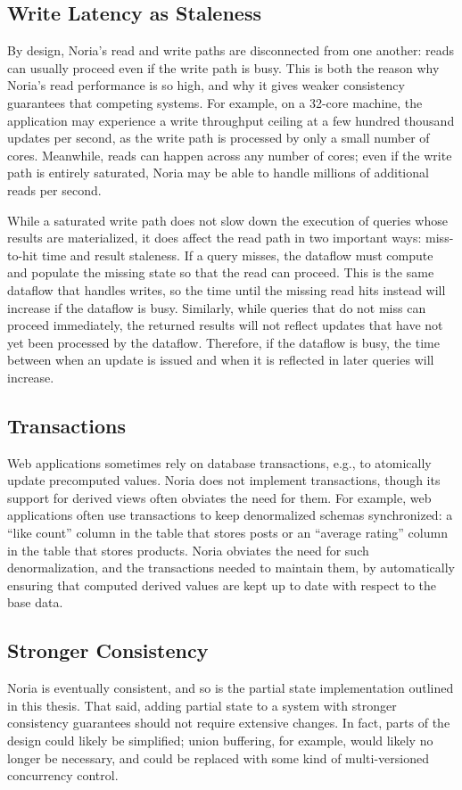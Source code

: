 \subsection{Write Latency as Staleness}

By design, Noria's read and write paths are disconnected from one another: reads
can usually proceed even if the write path is busy. This is both the reason why
Noria's read performance is so high, and why it gives weaker consistency
guarantees that competing systems. For example, on a 32-core machine, the
application may experience a write throughput ceiling at a few hundred thousand
updates per second, as the write path is processed by only a small number of
cores. Meanwhile, reads can happen across any number of cores; even if the write
path is entirely saturated, Noria may be able to handle millions of additional
reads per second.

While a saturated write path does not slow down the execution of queries whose
results are materialized, it does affect the read path in two important ways:
miss-to-hit time and result staleness. If a query misses, the dataflow must
compute and populate the missing state so that the read can proceed. This is the
same dataflow that handles writes, so the time until the missing read hits
instead will increase if the dataflow is busy. Similarly, while queries that do
not miss can proceed immediately, the returned results will not reflect updates
that have not yet been processed by the dataflow. Therefore, if the dataflow is
busy, the time between when an update is issued and when it is reflected in
later queries will increase.

\subsection{Transactions}

Web applications sometimes rely on database transactions, e.g., to atomically
update precomputed values. Noria does not implement transactions, though its
support for derived views often obviates the need for them. For example, web
applications often use transactions to keep denormalized schemas synchronized: a
``like count'' column in the table that stores posts or an ``average rating''
column in the table that stores products. Noria obviates the need for such
denormalization, and the transactions needed to maintain them, by automatically
ensuring that computed derived values are kept up to date with respect to the
base data.

\subsection{Stronger Consistency}

Noria is eventually consistent, and so is the partial state implementation
outlined in this thesis. That said, adding partial state to a system with
stronger consistency guarantees should not require extensive changes. In fact,
parts of the design could likely be simplified; union buffering, for example,
would likely no longer be necessary, and could be replaced with some kind of
multi-versioned concurrency control.
